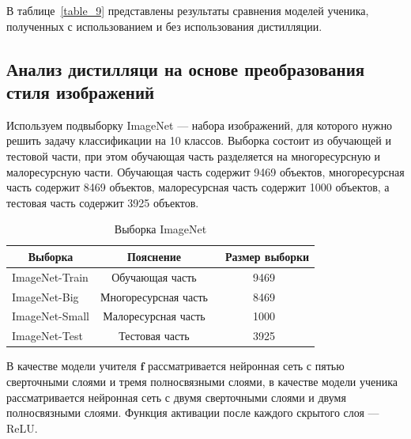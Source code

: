 В таблице~\ref{table_9} представлены результаты сравнения моделей ученика, полученных с использованием и без использования дистилляции.


\subsection{Анализ дистилляци на основе преобразования стиля изображений}
Используем подвыборку ImageNet --- набора изображений, для которого нужно решить задачу классификации на 10 классов. Выборка  состоит из обучающей и тестовой части, при этом обучающая часть разделяется на многоресурсную и малоресурсную части. Обучающая часть содержит 9469 объектов, многоресурсная часть содержит 8469  объектов, малоресурсная часть содержит 1000 объектов, а тестовая часть содержит 3925 объектов.

\begin{table}[h!t]
\begin{center}
\caption{Выборка ImageNet}
\label{table_10}
\begin{tabular}{|c|c|c|}
\hline
	Выборка & Пояснение &\ Размер выборки\\
	\hline
	\multicolumn{1}{|l|}{ImageNet-Train}
	& Обучающая часть& 9469\\
	\hline
	\multicolumn{1}{|l|}{ImageNet-Big}
	& Многоресурсная часть& 8469\\
	\hline
	\multicolumn{1}{|l|}{ImageNet-Small}
	& Малоресурсная часть& 1000\\
	\hline
	\multicolumn{1}{|l|}{ImageNet-Test}
	& Тестовая часть& 3925\\
\hline
\end{tabular}
\end{center}
\end{table}

В качестве модели учителя $\textbf{f}$ рассматривается нейронная сеть с пятью сверточными слоями и тремя полносвязными слоями, в качестве модели ученика рассматривается нейронная сеть с двумя сверточными слоями и двумя полносвязными слоями. Функция активации после каждого скрытого слоя --- ReLU.

